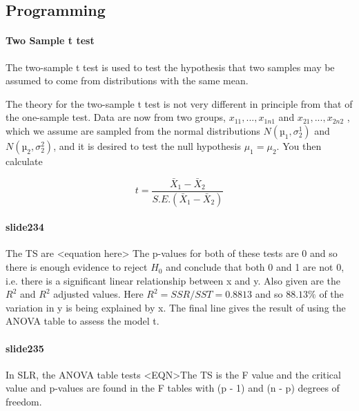 \documentclass[a4paper,12pt]{article}
\begin{document}
\begin{itemize}
\begin{itemize}
\newpage
\chapter{Programming}







\subsubsection{Two Sample t test}

The two-sample t test is used to test the hypothesis that two samples may
be assumed to come from distributions with the same mean.

The theory for the two-sample t test is not very different in principle from
that of the one-sample test. Data are now from two groups, $x_{11}, . . . , x_{1n1}$
and $x_{21}, . . . , x_{2n2}$ , which we assume are sampled from the normal distributions
$N(µ_{1}, \sigma^{1}_{2} )$ and
$N(µ_{2}, \sigma^{2}_{2} )$, and it is desired to test the null hypothesis
$\mu_{1} = \mu_{2}$. You then calculate

\[
t = \frac{\bar{X}_{1}-\bar{X}_{2}}{S.E.(\bar{X}_{1}-\bar{X}_{2})}
\]




\subsubsection{slide234}
The TS are <equation here>  
The p-values for both of these tests are 0 and so there is enough evidence to reject $H_0$ and conclude that both 0 and 1 are not 0, i.e. there is a significant linear relationship between x and y. 
Also given are the $R^2$ and $R^2$ adjusted values. Here $R^2 = SSR/SST = 0.8813$ and so $88.13\%$ of the variation in y is being explained by x. 
The final line gives the result of using the ANOVA table to assess the model t.


\subsubsection{slide235}

In SLR, the ANOVA table tests <EQN>The TS is the F value and the critical value and p-values are found
in the F tables with (p - 1) and (n - p) degrees of freedom.


\end{itemize}
\end{itemize}
\end{document}
